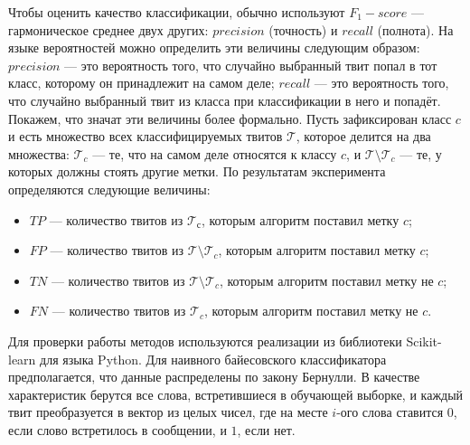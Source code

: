 Чтобы оценить качество классификации, обычно используют $F_1-score$ --- гармоническое среднее двух
других: $precision$ (точность) и $recall$ (полнота). На языке вероятностей можно определить эти величины следующим образом: $precision$ --- это
вероятность того, что случайно выбранный твит попал в тот класс, которому он принадлежит
на самом деле; $recall$ --- это вероятность того, что случайно выбранный твит из класса
при классификации в него и попадёт. Покажем, что значат эти величины более формально.
Пусть зафиксирован класс $c$ и есть множество всех классифицируемых твитов $\mathcal{T}$,
которое делится на два множества: $\mathcal{T}_c$ --- те, что на самом деле относятся к классу $c$,
и $\mathcal{T}\setminus\mathcal{T}_c$ --- те, у которых должны стоять другие метки.
По результатам эксперимента определяются следующие величины:
  \begin{itemize}
    \setlength{\itemsep}{1pt}%
    \setlength{\parskip}{1pt}
  \item[ ] $TP$ --- количество твитов из $\mathcal{T}_с$, которым алгоритм поставил метку $c$; \nopagebreak
  \item[ ] $FP$ --- количество твитов из $\mathcal{T}\setminus\mathcal{T}_c$, которым алгоритм поставил метку $c$; \nopagebreak
  \item[ ] $TN$ --- количество твитов из $\mathcal{T}\setminus\mathcal{T}_c$, которым алгоритм поставил метку не $c$; \nopagebreak
  \item[ ] $FN$ --- количество твитов из $\mathcal{T}_c$, которым алгоритм поставил метку не $c$.
  \end{itemize}

Для проверки работы методов используются реализации из библиотеки
Scikit-learn \cite{scikit-learn} для языка Python. Для наивного байесовского классификатора предполагается, что данные
распределены по закону Бернулли.
В качестве характеристик берутся все слова, встретившиеся в обучающей выборке,
и каждый твит преобразуется в вектор из целых чисел, где
на месте $i$-ого слова ставится $0$, если слово встретилось в сообщении, и $1$, если нет.

